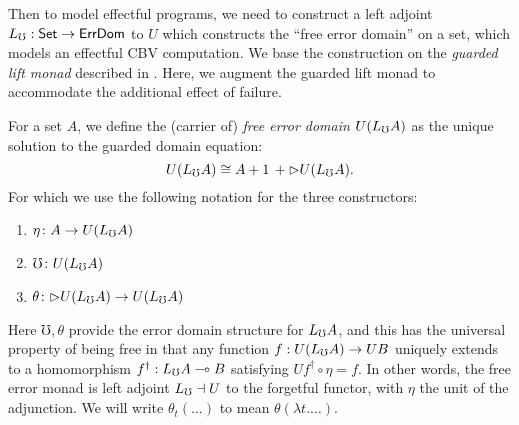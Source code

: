 
Then to model effectful programs, we need to construct a left adjoint
$L_\mho : \mathsf{Set} \to \mathsf{ErrDom}$ to $U$ which constructs the ``free error
domain'' on a set, which models an effectful CBV computation.
We base the construction on the \emph{guarded
lift monad} described in \cite{mogelberg-paviotti2016}. Here, we augment the
guarded lift monad to accommodate the additional effect of failure.
\begin{definition}
  For a set $A$, we define the (carrier of) \emph{free error domain} $U(L_\mho A)$ as the unique solution to the guarded domain equation:
  \[ U(L_\mho A) \cong A + 1\, + {{\vartriangleright}} U(L_\mho A). \]
  For which we use the following notation for the three constructors:
  \begin{enumerate}
  \item $\eta \colon A \to U(L_\mho A)$
  \item $\mho \colon U(L_\mho A)$
  \item $\theta \colon {{\vartriangleright}} U(L_\mho A) \to U(L_\mho A)$
  \end{enumerate}
  Here $\mho, \theta$ provide the error domain structure for $L_\mho A$,
  and this has the universal property of being free in that any
  function $f : U(L_\mho A) \to UB$ uniquely extends to a homomorphism
  $f^\dagger : L_\mho A \multimap B$ satisfying $Uf^\dagger \circ \eta =
  f$. In other words, the free error monad is left adjoint $L_\mho \dashv
  U$ to the forgetful functor, with $\eta$ the unit of the adjunction.
  We will write $\theta_t(\dots)$ to mean $\theta (\lambda t. \dots)$.
\end{definition}
